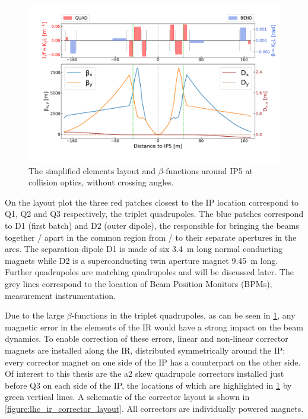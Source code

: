 \begin{figure}[!hbt]
  \centering
  \includegraphics*[width=0.99\linewidth]{Figures/Optics_Measurements_Corrections_at_LHC/lhc_ir5_zoomed.pdf}
  \caption{The simplified elements layout and \(\beta\)-functions around IP\num{5} at collision optics, without crossing angles.}
  \label{figure:lhc_ir5_zoomed}
\end{figure}

On the layout plot the three \textcolor{latwiss_red}{red patches} closest to the IP location correspond to Q\num{1}, Q\num{2} and Q\num{3} respectively, the triplet quadrupoles.
The \textcolor{latwiss_blue}{blue patches} correspond to D\num{1} (first batch) and D\num{2} (outer dipole), the  responsible for bringing the beams together / apart in the common region from / to their separate apertures in the arcs.
The separation dipole D\num{1} is made of six \qty{3.4}{\meter} long normal conducting magnets while D\num{2} is a superconducting twin aperture magnet \qty{9.45}{\meter} long.
Further quadrupoles are matching quadrupoles and will be discussed later.
The grey lines correspond to the location of Beam Position Monitors (BPMs), measurement instrumentation.

Due to the large \(\beta\)-functions in the triplet quadrupoles, as can be seen in \cref{figure:lhc_ir5_zoomed}, any magnetic error in the elements of the IR would have a strong impact on the beam dynamics.
To enable correction of these errors, linear and non-linear corrector magnets are installed along the IR, distributed symmetrically around the IP: every corrector magnet on one side of the IP has a counterpart on the other side.
Of interest to this thesis are the a\num{2} skew quadrupole correctors installed just before Q\num{3} on each side of the IP, the locations of which are highlighted in \cref{figure:lhc_ir5_zoomed} by green vertical lines.
A schematic of the corrector layout is shown in \cref{figure:lhc_ir_corrector_layout}.
All correctors are individually powered magnets.

